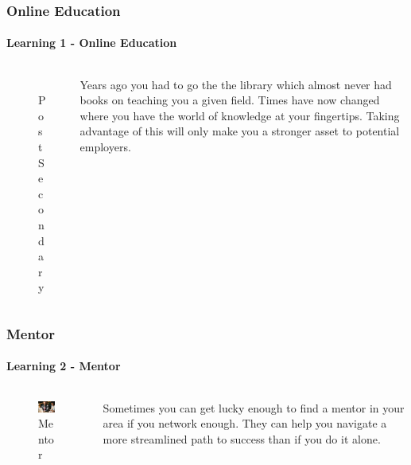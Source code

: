 \documentclass[aspectratio=169]{beamer}
\begin{document}
\begin{frame}
  \frametitle{Online Education}
  \framesubtitle{Learning 1 - Online Education}
  \begin{columns}[onlytextwidth]
    \begin{column}{.30\textwidth}
      \begin{figure}
        \includegraphics[width=5.5cm,keepaspectratio]{online}
        \caption{Post Secondary}
      \end{figure}
    \end{column}
    \hfill
    \begin{column}{.60\textwidth}
        \begin{tcolorbox}[title=online.log,colback=gray]
          Years ago you had to go the the library which almost never had books on teaching you a given field. Times have now changed where you have the world of knowledge at your fingertips. Taking advantage of this will only make you a stronger asset to potential employers.
        \end{tcolorbox}
    \end{column}
  \end{columns}
\end{frame}

\begin{frame}
  \frametitle{Mentor}
  \framesubtitle{Learning 2 - Mentor}
  \begin{columns}[onlytextwidth]
    \begin{column}{.30\textwidth}
      \begin{figure}
        \includegraphics[width=5.5cm,keepaspectratio]{mentor}
        \caption{Mentor}
      \end{figure}
    \end{column}
    \hfill
    \begin{column}{.60\textwidth}
        \begin{tcolorbox}[title=mentor.log,colback=gray]
          Sometimes you can get lucky enough to find a mentor in your area if you network enough. They can help you navigate a more streamlined path to success than if you do it alone.
        \end{tcolorbox}
    \end{column}
  \end{columns}
\end{frame}
\end{document}
